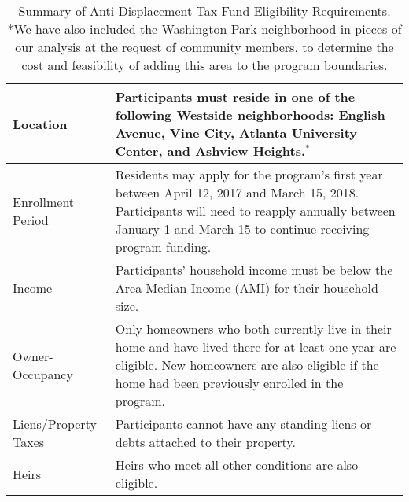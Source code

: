 \documentclass{acm_proc_article-sp}
\begin{document}
\begin{table}[ht!]
\centering
\begin{tabular}{|l|p{3.8cm}|}
\hline
Location             & Participants must reside in one of the following Westside neighborhoods: English Avenue, Vine City, Atlanta University Center, and Ashview Heights.$^{*}$                                                     \\ \hline
Enrollment Period	 & Residents may apply for the program's first year between April 12, 2017 and March 15, 2018. Participants will need to reapply annually between January 1 and March 15 to continue receiving program funding.
\\ \hline
Income               & Participants' household income must be below the Area Median Income (AMI) for their household size.                                                                                                      \\ \hline
Owner-Occupancy      & Only homeowners who both currently live in their home and have lived there for at least one year are eligible. New homeowners are also eligible if the home had been previously enrolled in the program. \\ \hline
Liens/Property Taxes & Participants cannot have any standing liens or debts attached to their property.                                                                                                            \\ \hline
Heirs                & Heirs who meet all other conditions are also eligible.                                                                                                                                                   \\ \hline
\end{tabular}
\caption{Summary of Anti-Displacement Tax Fund Eligibility Requirements. *We have also included the Washington Park neighborhood in pieces of our analysis at the request of community members, to determine the cost and feasibility of adding this area to the program boundaries.}
\label{elig}
\end{table}
\end{document}
